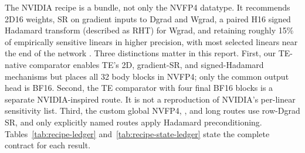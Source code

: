 The NVIDIA recipe is a bundle, not only the NVFP4 datatype. It recommends
2D16 weights, SR on gradient inputs to Dgrad and Wgrad, a paired H16 signed
Hadamard transform (described as RHT) for
Wgrad, and retaining roughly 15\% of empirically sensitive linears in higher
precision, with most selected linears near the end of the network
\cite{nvidia2025nvfp4}. Three distinctions matter in this report. First, our
TE-native comparator enables TE's 2D, gradient-SR, and signed-Hadamard
mechanisms but places all 32 body blocks in NVFP4; only the common output head
is BF16. Second, the TE comparator with four final BF16 blocks is a separate
NVIDIA-inspired route. It is not a reproduction of NVIDIA's per-linear
sensitivity list. Third, the custom global NVFP4, \mxfp{}, and \localcta{} long routes
use row-Dgrad SR, and only explicitly named routes apply Hadamard
preconditioning. Tables~\ref{tab:recipe-ledger}
and~\ref{tab:recipe-state-ledger} state the complete contract for each result.

